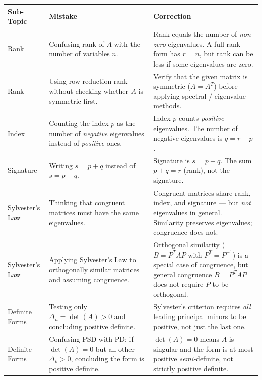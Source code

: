 \documentclass[12pt,a4paper]{article}
\begin{document}
\begin{mistakebox}
\begin{tabular}{@{}p{3.2cm} p{5.0cm} p{6.2cm}@{}}
\toprule
\textbf{Sub-Topic} & \textbf{Mistake} & \textbf{Correction} \\
\midrule
Rank &
  Confusing rank of \(A\) with the number of variables \(n\). &
  Rank equals the number of \emph{non-zero} eigenvalues. A full-rank form has
  \(r = n\), but rank can be less if some eigenvalues are zero. \\
\addlinespace
Rank &
  Using row-reduction rank without checking whether \(A\) is symmetric first. &
  Verify that the given matrix is symmetric (\(A = A^T\)) before applying
  spectral / eigenvalue methods. \\
\addlinespace
Index &
  Counting the index \(p\) as the number of \emph{negative} eigenvalues
  instead of \emph{positive} ones. &
  Index \(p\) counts \emph{positive} eigenvalues. The number of negative
  eigenvalues is \(q = r - p\). \\
\addlinespace
Signature &
  Writing \(s = p + q\) instead of \(s = p - q\). &
  Signature is \(s = p - q\). The sum \(p + q = r\) (rank), not the signature. \\
\addlinespace
Sylvester's Law &
  Thinking that congruent matrices must have the same eigenvalues. &
  Congruent matrices share rank, index, and signature --- but \emph{not}
  eigenvalues in general. Similarity preserves eigenvalues; congruence does not. \\
\addlinespace
Sylvester's Law &
  Applying Sylvester's Law to orthogonally similar matrices and assuming
  congruence. &
  Orthogonal similarity (\(B = P^T A P\) with \(P^T = P^{-1}\)) is a special
  case of congruence, but general congruence \(B = P^T A P\) does not require
  \(P\) to be orthogonal. \\
\addlinespace
Definite Forms &
  Testing only \(\Delta_n = \det(A) > 0\) and concluding positive definite. &
  Sylvester's criterion requires \emph{all} leading principal minors to be
  positive, not just the last one. \\
\addlinespace
Definite Forms &
  Confusing PSD with PD: if \(\det(A) = 0\) but all other \(\Delta_k > 0\),
  concluding the form is positive definite. &
  \(\det(A) = 0\) means \(A\) is singular and the form is at most positive
  \emph{semi-}definite, not strictly positive definite. \\
\bottomrule
\end{tabular}
\end{mistakebox}
\end{document}
